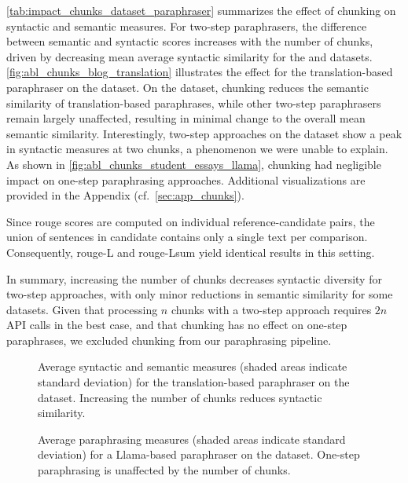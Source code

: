 \autoref{tab:impact_chunks_dataset_paraphraser} summarizes the effect of chunking on syntactic and semantic measures. 
For two-step paraphrasers, the difference between semantic and syntactic scores increases with the number of chunks, driven by decreasing mean average syntactic similarity for the \dataBlog{} and \dataStudent{} datasets. 
\autoref{fig:abl_chunks_blog_translation} illustrates the effect for the translation-based paraphraser on the \dataBlog{} dataset. 
On the \dataGutenberg{} dataset, chunking reduces the semantic similarity of translation-based paraphrases, while other two-step paraphrasers remain largely unaffected, resulting in minimal change to the overall mean semantic similarity. 
Interestingly, two-step approaches on the \dataPan{} dataset show a peak in syntactic measures at two chunks, a phenomenon we were unable to explain. 
As shown in \autoref{fig:abl_chunks_student_essays_llama}, chunking had negligible impact on one-step paraphrasing approaches. 
Additional visualizations are provided in the Appendix (cf.~\autoref{sec:app_chunks}).

Since \ac{rouge} scores are computed on individual reference-candidate pairs, the union of sentences in candidate contains only a single text per comparison. 
Consequently, \ac{rouge}-L and \ac{rouge}-Lsum yield identical results in this setting.

In summary, increasing the number of chunks decreases syntactic diversity for two-step approaches, with only minor reductions in semantic similarity for some datasets. 
Given that processing $n$ chunks with a two-step approach requires $2n$ API calls in the best case, and that chunking has no effect on one-step paraphrases, we excluded chunking from our paraphrasing pipeline.

\begin{figure}[htbp]
    \centering
    
    \caption[Impact of the number of chunks on \dataBlog{} dataset.]{
    Average syntactic and semantic measures (shaded areas indicate standard deviation) for the translation-based paraphraser on the \dataBlog{} dataset. 
    Increasing the number of chunks reduces syntactic similarity.    
    }
    \label{fig:abl_chunks_blog_translation}
\end{figure}

\begin{figure}[htbp]
    \centering
    
    \caption[Impact of the number of chunks on \dataStudent{} dataset.]{Average paraphrasing measures (shaded areas indicate standard deviation) for a Llama-based paraphraser on the \dataStudent{} dataset. 
    One-step paraphrasing is unaffected by the number of chunks.
    }
    \label{fig:abl_chunks_student_essays_llama}
\end{figure}